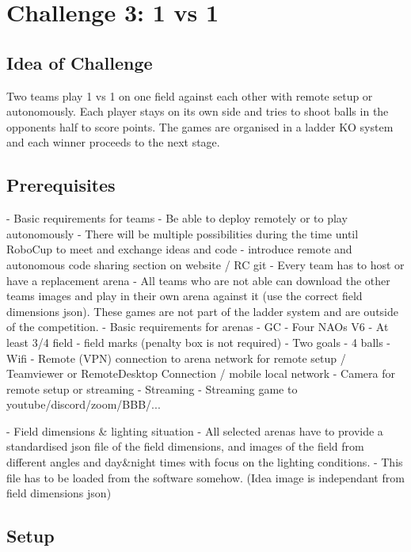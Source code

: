 \section{Challenge 3: 1 vs 1}

\subsection{Idea of Challenge}

Two teams play 1 vs 1 on one field against each other with remote setup or autonomously. Each player stays on its own side and tries to shoot balls in the opponents half to score points.
The games are organised in a ladder KO system and each winner proceeds to the next stage.

\subsection{Prerequisites}
- Basic requirements for teams
    - Be able to deploy remotely or to play autonomously
    - There will be multiple possibilities during the time until RoboCup to meet and exchange ideas and code
    - introduce remote and autonomous code sharing section on website / RC git
    - Every team has to host or have a replacement arena 
    - All teams who are not able can download the other teams images and play in their own arena against it (use the correct field dimensions json). These games are not part of the ladder system and are outside of the competition.
- Basic requirements for arenas
    - GC
    - Four NAOs V6
    - At least 3/4 field
    - field marks (penalty box is not required)
    - Two goals
    - 4 balls
    - Wifi
    - Remote (VPN) connection to arena network for remote setup / Teamviewer or RemoteDesktop Connection / mobile local network
    - Camera for remote setup or streaming
- Streaming
    - Streaming game to youtube/discord/zoom/BBB/...

- Field dimensions \& lighting situation
    - All selected arenas have to provide a standardised json file of the field dimensions, and images of the field from different angles and day\&night times with focus on the lighting conditions.
    - This file has to be loaded from the software somehow. (Idea image is independant from field dimensions json)

\subsection{Setup}

